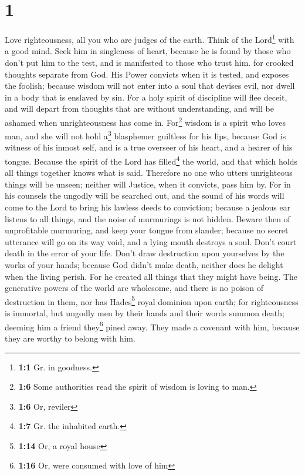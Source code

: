 \hypertarget{section}{%
\section{1}\label{section}}

 Love righteousness, all you who are judges of the earth.
Think of the Lord\footnote{\textbf{1:1} Gr. in goodness.} with a good
mind. Seek him in singleness of heart,  because he is
found by those who don't put him to the test, and is manifested to those
who trust him.  for crooked thoughts separate from God.
His Power convicts when it is tested, and exposes the foolish;
 because wisdom will not enter into a soul that devises
evil, nor dwell in a body that is enslaved by sin.  For a
holy spirit of discipline will flee deceit, and will depart from
thoughts that are without understanding, and will be ashamed when
unrighteousness has come in.  For\footnote{\textbf{1:6}
  Some authorities read the spirit of wisdom is loving to man.} wisdom
is a spirit who loves man, and she will not hold a\footnote{\textbf{1:6}
  Or, reviler} blasphemer guiltless for his lips, because God is witness
of his inmost self, and is a true overseer of his heart, and a hearer of
his tongue.  Because the spirit of the Lord has
filled\footnote{\textbf{1:7} Gr. the inhabited earth.} the world, and
that which holds all things together knows what is said. 
Therefore no one who utters unrighteous things will be unseen; neither
will Justice, when it convicts, pass him by.  For in his
counsels the ungodly will be searched out, and the sound of his words
will come to the Lord to bring his lawless deeds to conviction;
 because a jealous ear listens to all things, and the
noise of murmurings is not hidden.  Beware then of
unprofitable murmuring, and keep your tongue from slander; because no
secret utterance will go on its way void, and a lying mouth destroys a
soul.  Don't court death in the error of your life. Don't
draw destruction upon yourselves by the works of your hands;
 because God didn't make death, neither does he delight
when the living perish.  For he created all things that
they might have being. The generative powers of the world are wholesome,
and there is no poison of destruction in them, nor has Hades\footnote{\textbf{1:14}
  Or, a royal house} royal dominion upon earth;  for
righteousness is immortal,  but ungodly men by their
hands and their words summon death; deeming him a friend they\footnote{\textbf{1:16}
  Or, were consumed with love of him} pined away. They made a covenant
with him, because they are worthy to belong with him.

